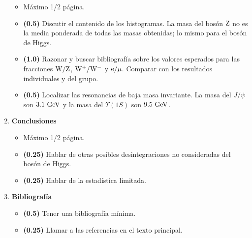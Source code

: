 \documentclass[11pt]{articulo}
\begin{document}
\begin{enumerate}
\begin{itemize}
\item M\'aximo 1/2 p\'agina.

\item {\bf (0.5)} Discutir el contenido de los histogramas. La masa del bos\'on ${\rm Z}$ no es la media ponderada de todas las masas obtenidas; lo mismo para el bos\'on de Higgs.

\item {\bf (1.0)} Razonar y buscar bibliograf\'ia sobre los valores esperados para las fracciones ${\rm W/Z}$, ${\rm W^+/W^-}$ y ${\rm e/\mu}$. Comparar con los resultados individuales y del grupo.

\item {\bf (0.5)} Localizar las resonancias de baja masa invariante. La masa del $J/\psi$ son ${\rm 3.1~GeV}$ y la masa del $\Upsilon(1S)$ son ${\rm 9.5~GeV}$.

\end{itemize}

\item {\bf Conclusiones}

\begin{itemize}

\item M\'aximo 1/2 p\'agina.

\item {\bf (0.25)} Hablar de otras posibles desintegraciones no consideradas del bos\'on de Higgs.

\item {\bf (0.25)} Hablar de la estad\'istica limitada.

\end{itemize}

\item {\bf Bibliograf\'ia}

\begin{itemize}

\item {\bf (0.5)} Tener una bibliograf\'ia m\'inima.

\item {\bf (0.25)} Llamar a las referencias en el texto principal.

\end{itemize}

\end{enumerate}
\end{document}
